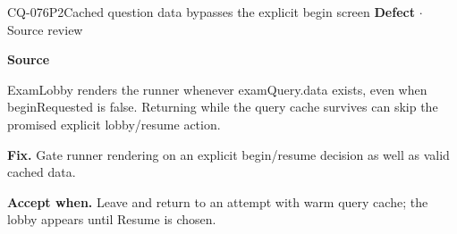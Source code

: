 \begin{finding}{CQ-076}{P2}{Cached question data bypasses the explicit begin screen}
\textbf{Defect} $\cdot$ Source review\par
\textbf{Source}\quad{}\par
ExamLobby renders the runner whenever examQuery.data exists, even when beginRequested is false. Returning while the query cache survives can skip the promised explicit lobby/resume action.\par
\textbf{Fix.} Gate runner rendering on an explicit begin/resume decision as well as valid cached data.\par
\textbf{Accept when.} Leave and return to an attempt with warm query cache; the lobby appears until Resume is chosen.
\end{finding}
\clearpage
